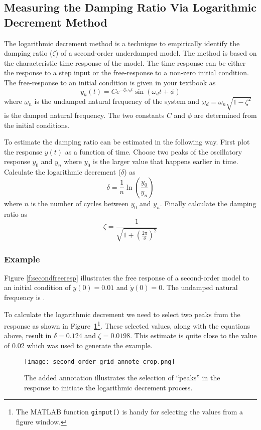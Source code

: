 \subsection{Measuring the Damping Ratio Via Logarithmic Decrement Method}

The logarithmic decrement method is a technique to empirically identify the damping ratio ($\zeta$) of a second-order underdamped model.  The method is based on the characteristic time response of the model.  The time response can be either the response to a step input or the free-response to a non-zero initial condition.  The free-response to an initial condition is given in your textbook as
\begin{equation}
y_h(t)=C e^{-\zeta\omega_nt}\sin\left(\omega_dt+\phi\right) 
\end{equation}
where $\omega_n$ is the undamped natural frequency of the system and $\omega_d=\omega_n\sqrt{1-\zeta^2}$ is the damped natural frequency.  The two constants $C$ and $\phi$ are determined from the initial conditions.

To estimate the damping ratio can be estimated in the following way.  First plot the response $y(t)$ as a function of time.  Choose two peaks of the oscillatory response $y_0$ and $y_n$ where $y_0$ is the larger value that happens earlier in time.  Calculate the logarithmic decrement ($\delta$) as
\[ \delta = \frac{1}{n}\ln\left(\frac{y_0}{y_n}\right) \]
where $n$ is the number of cycles between $y_0$ and $y_n$.
Finally calculate the damping ratio as
\[ \zeta = \frac{1}{\sqrt{1+\left(\frac{2\pi}{\delta}\right)^2}} \]

\subsubsection{Example}
Figure \ref{f:secondfreeresp} illustrates the free response of a second-order model to an initial condition of $y(0)=0.01$ and $\dot{y}(0)=0$.  The undamped natural frequency is .

To calculate the logarithmic decrement we need to select two peaks from the response as shown in Figure~\ref{f:resp2}\footnote{The MATLAB function \texttt{ginput()} is handy for selecting the values from a figure window.}. These selected values, along with the equations above, result in $\delta=0.124$ and $\zeta=0.0198$.  This estimate is quite close to the value of 0.02 which was used to generate the example.

\begin{figure}[h!bt]
\centerline{
{\texttt{[image: second\_order\_grid\_annote\_crop.png]}}}
\caption{The added annotation illustrates the selection of ``peaks'' in the response to initiate the logarithmic decrement process.}
\label{f:resp2}
\end{figure}

